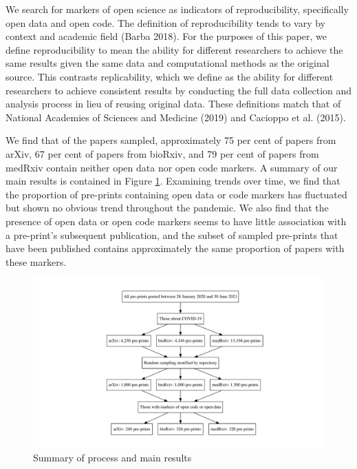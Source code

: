 \documentclass[
]{article}
\begin{document}
We search for markers of open science as indicators of reproducibility, specifically open data and open code. The definition of reproducibility tends to vary by context and academic field (Barba 2018). For the purposes of this paper, we define reproducibility to mean the ability for different researchers to achieve the same results given the same data and computational methods as the original source. This contrasts replicability, which we define as the ability for different researchers to achieve consistent results by conducting the full data collection and analysis process in lieu of reusing original data. These definitions match that of National Academies of Sciences and Medicine (2019) and Cacioppo et al. (2015).

We find that of the papers sampled, approximately 75 per cent of papers from arXiv, 67 per cent of papers from bioRxiv, and 79 per cent of papers from medRxiv contain neither open data nor open code markers. A summary of our main results is contained in Figure \ref{fig:flowchart}. Examining trends over time, we find that the proportion of pre-prints containing open data or code markers has fluctuated but shown no obvious trend throughout the pandemic. We also find that the presence of open data or open code markers seems to have little association with a pre-print's subsequent publication, and the subset of sampled pre-prints that have been published contains approximately the same proportion of papers with these markers.

\begin{figure}

{\centering \includegraphics[width=0.9\linewidth]{paper_files/figure-latex/flowchart-1} 

}

\caption{Summary of process and main results}\label{fig:flowchart}
\end{figure}
\end{document}
